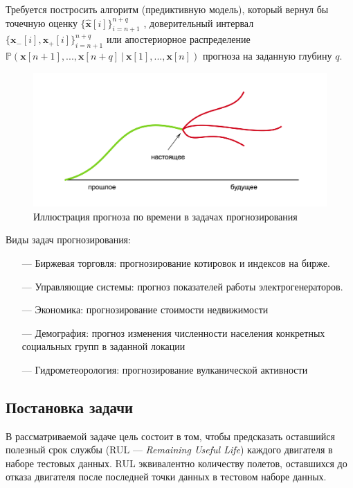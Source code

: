 \documentclass[14pt]{extarticle}
\begin{document}
Требуется постросить алгоритм (предиктивную модель), который вернул бы точечную оценку $\{\hat{\textbf{x}}[i]\}_{i = n+1}^{n+q}$ , доверительный интервал $\{\textbf{x}_-[i], \textbf{x}_+[i]\}_{i = n+1}^{n+q}$ или апостериорное распределение $\mathbb{P}(\textbf{x}[n + 1], ... , \textbf{x}[n + q] \: | \: \textbf{x}[1], ... , \textbf{x}[n])$ прогноза на заданную глубину $q$.

\begin{figure}[h]
	\centering
	\includegraphics[width=1.0\textwidth]{img/pred_task_diagram_t.png}
	\caption{Иллюстрация прогноза по времени в задачах прогнозирования}
	\label{fig:components}
\end{figure}

Виды задач прогнозирования:
\begin{itemize}
	
	\item[---] Биржевая торговля: прогнозирование котировок и индексов на бирже.
	\item[---] Управляющие системы: прогноз показателей работы электрогенераторов.
	\item[---] Экономика: прогнозирование стоимости недвижимости
	\item[---] Демография: прогноз изменения численности населения конкретных социальных групп в заданной локации
	\item[---] Гидрометеорология: прогнозирование вулканической активности
	
\end{itemize}

\subsection{Постановка задачи}

В рассматриваемой задаче цель состоит в том, чтобы предсказать оставшийся полезный срок службы (RUL --- {\it Remaining Useful Life}) каждого двигателя в наборе тестовых данных. RUL эквивалентно количеству полетов, оставшихся до отказа двигателя после последней точки данных в тестовом наборе данных.
\end{document}
